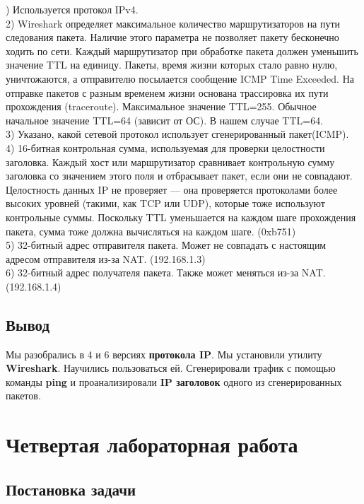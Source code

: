 ) Используется протокол IPv4.\\
2) Wireshark определяет максимальное количество маршрутизаторов на пути следования пакета. Наличие этого параметра не позволяет пакету бесконечно ходить по сети.
Каждый маршрутизатор при обработке пакета должен уменьшить значение TTL на
единицу. Пакеты, время жизни которых стало равно нулю, уничтожаются, а
отправителю посылается сообщение ICMP Time Exceeded. На отправке пакетов с
разным временем жизни основана трассировка их пути прохождения (traceroute).
Максимальное значение TTL=255. Обычное начальное значение TTL=64 (зависит от
ОС). В нашем случае TTL=64.\\
3) Указано, какой сетевой протокол использует сгенерированный пакет(ICMP).\\
4) 16-битная контрольная сумма, используемая для проверки целостности заголовка. Каждый хост или маршрутизатор сравнивает контрольную сумму заголовка со
значением этого поля и отбрасывает пакет, если они не совпадают. Целостность
данных IP не проверяет — она проверяется протоколами более высоких уровней
(такими, как TCP или UDP), которые тоже используют контрольные суммы.
Поскольку TTL уменьшается на каждом шаге прохождения пакета, сумма тоже должна
вычисляться на каждом шаге. (0xb751)\\
5) 32-битный адрес отправителя пакета. Может не совпадать с настоящим адресом отправителя из-за NAT. (192.168.1.3)\\
6) 32-битный адрес получателя пакета. Также может меняться из-за NAT. (192.168.1.4) 



\subsection{Вывод}
Мы разобрались в 4 и 6 версиях \textbf{протокола IP}. Мы установили утилиту \textbf{Wireshark}. Научились пользоваться ей. Сгенерировали трафик с
помощью команды \textbf{ping} и проанализировали \textbf{IP заголовок} одного из сгенерированных пакетов.

\newpage

\section{Четвертая лабораторная работа}

\subsection{Постановка задачи}


